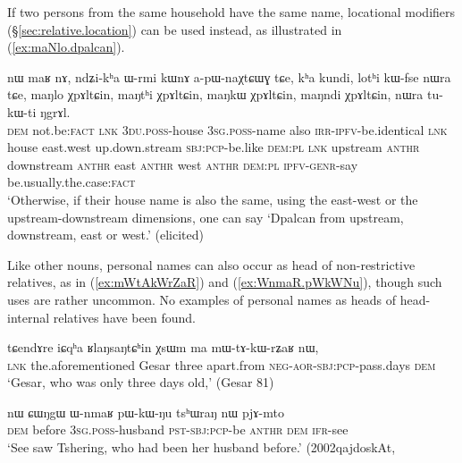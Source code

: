 If  two persons from the same household have the same name, locational modifiers (§\ref{sec:relative.location}) can be used instead, as illustrated in (\ref{ex:maNlo.dpalcan}).

\begin{exe}
\ex \label{ex:maNlo.dpalcan}
\gll  nɯ maʁ nɤ, ndʑi-kʰa ɯ-rmi kɯnɤ a-pɯ-naχtɕɯɣ tɕe, kʰa kundi, lotʰi kɯ-fse nɯra tɕe, 
maŋlo χpɤltɕin, maŋtʰi χpɤltɕin, maŋkɯ χpɤltɕin, maŋndi χpɤltɕin, nɯra tu-kɯ-ti ŋgrɤl. \\
\textsc{dem} not.be:\textsc{fact} \textsc{lnk} \textsc{3du}.\textsc{poss}-house \textsc{3sg}.\textsc{poss}-name also \textsc{irr}-\textsc{ipfv}-be.identical \textsc{lnk} house east.west up.down.stream \textsc{sbj}:\textsc{pcp}-be.like \textsc{dem}:\textsc{pl} \textsc{lnk} upstream  \textsc{anthr} downstream  \textsc{anthr} east  \textsc{anthr} west  \textsc{anthr} \textsc{dem}:\textsc{pl} \textsc{ipfv}-\textsc{genr}-say be.usually.the.case:\textsc{fact} \\
\glt `Otherwise, if their house name is also the same, using the east-west or the upstream-downstream dimensions, one can say `Dpalcan from upstream, downstream, east or west.' (elicited)
\end{exe}

Like other nouns, personal names can also occur as head of non-restrictive relatives, as in  (\ref{ex:mWtAkWrZaR}) and (\ref{ex:WnmaR.pWkWNu}), though such uses are rather uncommon. No examples of personal names as heads of head-internal relatives have been found.

  \begin{exe}
\ex \label{ex:mWtAkWrZaR}
\gll  tɕendɤre  iɕqʰa  ʁlaŋsaŋtɕʰin  χsɯm  ma  mɯ-tɤ-kɯ-rʑaʁ  nɯ, \\
\textsc{lnk} the.aforementioned Gesar three apart.from \textsc{neg}-\textsc{aor}-\textsc{sbj}:\textsc{pcp}-pass.days \textsc{dem} \\
\glt `Gesar, who was only three days old,'  (Gesar 81)
\end{exe}

\begin{exe}
\ex \label{ex:WnmaR.pWkWNu}
\gll nɯ ɕɯŋgɯ ɯ-nmaʁ pɯ-kɯ-ŋu tsʰɯraŋ nɯ pjɤ-mto  \\
\textsc{dem} before \textsc{3sg}.\textsc{poss}-husband \textsc{pst}-\textsc{sbj}:\textsc{pcp}-be  \textsc{anthr} \textsc{dem} \textsc{ifr}-see \\
\glt `See saw Tshering, who had been her husband before.' (2002qajdoskAt, 
\end{exe}

